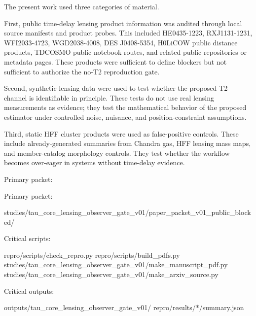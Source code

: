 \documentclass[11pt]{article}
\newenvironment{Shaded}{}{}
\newcommand{\NormalTok}[1]{#1}
\begin{document}
The present work used three categories of material.

First, public time-delay lensing product information was audited through
local source manifests and product probes. This included HE0435-1223,
RXJ1131-1231, WFI2033-4723, WGD2038-4008, DES J0408-5354, H0LiCOW public
distance products, TDCOSMO public notebook routes, and related public
repositories or metadata pages. These products were sufficient to define
blockers but not sufficient to authorize the no-T2 reproduction gate.

Second, synthetic lensing data were used to test whether the proposed T2
channel is identifiable in principle. These tests do not use real
lensing measurements as evidence; they test the mathematical behavior of
the proposed estimator under controlled noise, nuisance, and
position-constraint assumptions.

Third, static HFF cluster products were used as false-positive controls.
These include already-generated summaries from Chandra gas, HFF lensing
mass maps, and member-catalog morphology controls. They test whether the
workflow becomes over-eager in systems without time-delay evidence.

Primary packet:

Primary packet:

\begin{Shaded}
\begin{Highlighting}[]
\NormalTok{studies/tau\_core\_lensing\_observer\_gate\_v01/paper\_packet\_v01\_public\_blocked/}
\end{Highlighting}
\end{Shaded}

Critical scripts:

\begin{Shaded}
\begin{Highlighting}[]
\NormalTok{repro/scripts/check\_repro.py}
\NormalTok{repro/scripts/build\_pdfs.py}
\NormalTok{studies/tau\_core\_lensing\_observer\_gate\_v01/make\_manuscript\_pdf.py}
\NormalTok{studies/tau\_core\_lensing\_observer\_gate\_v01/make\_arxiv\_source.py}
\end{Highlighting}
\end{Shaded}

Critical outputs:

\begin{Shaded}
\begin{Highlighting}[]
\NormalTok{outputs/tau\_core\_lensing\_observer\_gate\_v01/}
\NormalTok{repro/results/*/summary.json}
\end{Highlighting}
\end{Shaded}
\end{document}
